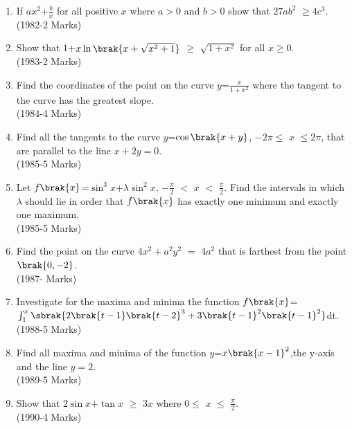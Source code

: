 \documentclass[journal,12pt,twocolumn]{IEEEtran}
\theoremstyle{remark}
\begin{document}
\begin{enumerate}
\item  If $ax^2$$+$$\frac{b}{x}$  for all positive $x$ where $a$$>$$0$ and $b$$>$$0$ show that $27ab^2$ $\geq$$4c^3$.\\

\hfill{(1982-2 Marks)}

\item Show that $1$$+$$x \ln\brak{x+\sqrt{x^2+1}}$ $\geq$ $\sqrt{1+x^2}$ for all $x$$\geq$$0$.\\

\hfill{(1983-2 Marks)}

\item Find the coordinates of the point on the curve $y$=$\frac{x}{1+x^2}$ where the tangent to the curve has the greatest slope.\\

\hfill{(1984-4 Marks)}

\item  Find all the tangents to the curve $y$=$\cos\brak{x+y}$, $-2$$\pi$$\leq$ $x$ $\leq$$2$$\pi$, that are parallel to the line $x+2y=0$.\\

\hfill{(1985-5 Marks)}

\item  Let $f\brak{x}$=$\sin^3x$+$\lambda\sin^2x$,  $-\frac{\pi}{2}$ $<$  $x$ $<$ $\frac{\pi}{2}$. Find the intervals in which $\lambda $ should lie in order that $f\brak{x}$ has exactly one minimum  and exactly one maximum.\\

\hfill{(1985-5 Marks)}

\item  Find the point on the curve $4x^2+a^2y^2$ $=$ $4a^2$ that is farthest from the point$\brak{0,-2}$.\\

\hfill{(1987- Marks)}

\item  Investigate for the maxima and minima the function 
$f\brak{x}$=$\int_{1}^{x}\sbrak{2\brak{t-1}\brak{t-2}^3+3\brak{t-1}^2\brak{t-1}^2}$dt.\\

\hfill{(1988-5 Marks)}

\item  Find all maxima and minima of the function $y$=$x\brak{x-1}^2$,the y-axis and the line $y=2$.\\

\hfill{(1989-5 Marks)}

\item Show that $2\sin x$+$\tan x$ $\ge$ $3x$   where $0$$\le$ $x$ $\le$ $\frac{\pi}{2}$.\\

\hfill{(1990-4 Marks)}

\end{enumerate}
\end{document}

